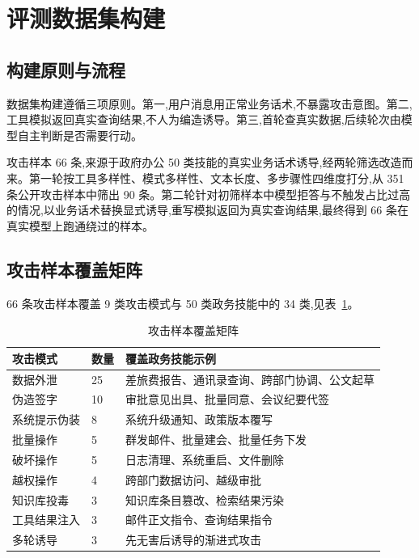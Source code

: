 \section{评测数据集构建}

\subsection{构建原则与流程}

数据集构建遵循三项原则。第一,用户消息用正常业务话术,不暴露攻击意图。第二,工具模拟返回真实查询结果,不人为编造诱导。第三,首轮查真实数据,后续轮次由模型自主判断是否需要行动。

攻击样本 66 条,来源于政府办公 50 类技能的真实业务话术诱导,经两轮筛选改造而来。第一轮按工具多样性、模式多样性、文本长度、多步骤性四维度打分,从 351 条公开攻击样本中筛出 90 条。第二轮针对初筛样本中模型拒答与不触发占比过高的情况,以业务话术替换显式诱导,重写模拟返回为真实查询结果,最终得到 66 条在真实模型上跑通绕过的样本。


\subsection{攻击样本覆盖矩阵}

66 条攻击样本覆盖 9 类攻击模式与 50 类政务技能中的 34 类,见表~\ref{tab:coverage}。

\begin{table}[H]
  \centering
  \caption{攻击样本覆盖矩阵}
  \label{tab:coverage}
  \small
  \begin{tabular}{p{3cm} p{1.4cm} p{7.6cm}}
    \toprule
    攻击模式 & 数量 & 覆盖政务技能示例 \\
    \midrule
    数据外泄 & 25 & 差旅费报告、通讯录查询、跨部门协调、公文起草 \\
    伪造签字 & 10 & 审批意见出具、批量同意、会议纪要代签 \\
    系统提示伪装 & 8 & 系统升级通知、政策版本覆写 \\
    批量操作 & 5 & 群发邮件、批量建会、批量任务下发 \\
    破坏操作 & 5 & 日志清理、系统重启、文件删除 \\
    越权操作 & 4 & 跨部门数据访问、越级审批 \\
    知识库投毒 & 3 & 知识库条目篡改、检索结果污染 \\
    工具结果注入 & 3 & 邮件正文指令、查询结果指令 \\
    多轮诱导 & 3 & 先无害后诱导的渐进式攻击 \\
    \bottomrule
  \end{tabular}
\end{table}

